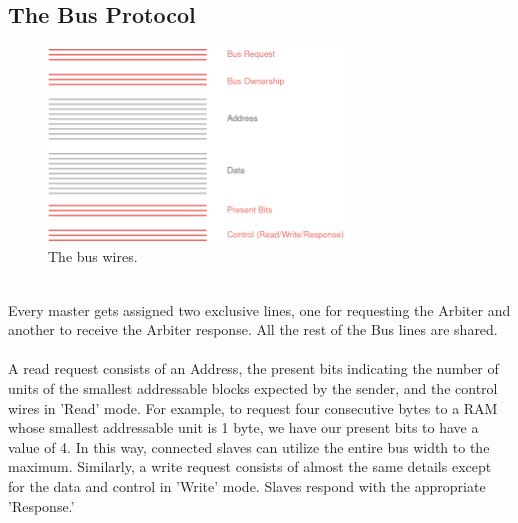 \begin{paper}
\section*{The Bus Protocol\sdot}
\begin{figure}[H]
\centering
\includegraphics[width=8cm]{Images/Overview-BusWires.png}
\caption{\content The bus wires.}
\end{figure}\\
\nointend Every master gets assigned two exclusive lines, one for requesting the Arbiter and another to receive the Arbiter response. All the rest of the Bus lines are shared.\\\\
\nointend A read request consists of an Address, the present bits indicating the number of units of the smallest addressable blocks expected by the sender, and the control wires in 'Read' mode. For example, to request four consecutive bytes to a RAM whose smallest addressable unit is 1 byte, we have our present bits to have a value of 4. In this way, connected slaves can utilize the entire bus width to the maximum. Similarly, a write request consists of almost the same details except for the data and control in 'Write' mode. Slaves respond with the appropriate 'Response.'

\end{paper}
